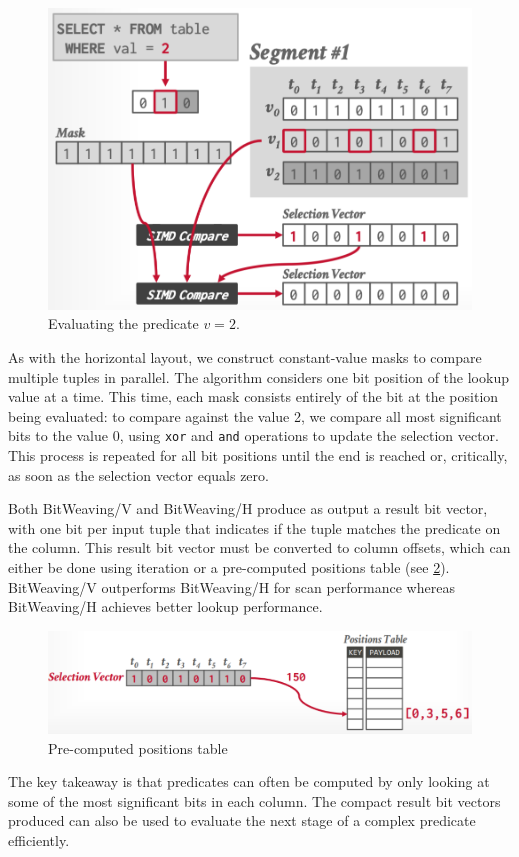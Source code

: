 \documentclass[11pt]{article}
\begin{document}
\begin{itemize}
    \begin{figure}[H]
    \centering
    \includegraphics[width=0.5\linewidth]{fig/vert-compare.pdf}
    \caption{Evaluating the predicate $v = 2$.}\label{fig:vert-compare}
    \end{figure}
    As with the horizontal layout, we construct constant-value masks to compare multiple tuples in parallel. The algorithm considers one bit position of the lookup value at a time. This time, each mask consists entirely of the bit at the position being evaluated: to compare against the value 2, we compare all most significant bits to the value 0, using \texttt{xor} and \texttt{and} operations to update the selection vector. This process is repeated for all bit positions until the end is reached or, critically, as soon as the selection vector equals zero.

\end{itemize}

Both BitWeaving/V and BitWeaving/H produce as output a result bit vector, with one bit per input tuple that indicates if the tuple matches the predicate on the column. This result bit vector must be converted to column offsets, which can either be done using iteration or a pre-computed positions table (see \cref{fig:bitweaving-positions-table}). BitWeaving/V outperforms BitWeaving/H for scan performance whereas BitWeaving/H achieves better lookup performance.

\begin{figure}[H]
    \centering
    \includegraphics[width=0.75\linewidth]{fig/bitweaving-positions-table.pdf}
    \caption{Pre-computed positions table}\label{fig:bitweaving-positions-table}
\end{figure}

The key takeaway is that predicates can often be computed by only looking at some of the most significant bits in each column. The compact result bit vectors produced can also be used to evaluate the next stage of a complex predicate efficiently.
\end{document}
